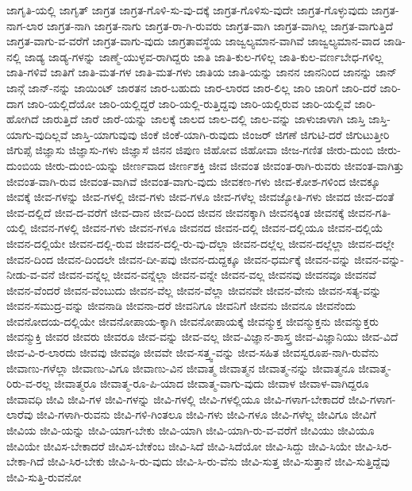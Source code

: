 {ಜಾಗೃತಿ-ಯಲ್ಲಿ
ಜಾಗೃತ್
ಜಾಗ್ರತ
ಜಾಗ್ರತ-ಗೊಳಿ-ಸು-ವು-ದಕ್ಕೆ
ಜಾಗ್ರತ-ಗೊಳಿಸು-ವುದೇ
ಜಾಗ್ರತ-ಗೊಳ್ಳುವುದು
ಜಾಗ್ರತ-ನಾಗ-ಲಾರ
ಜಾಗ್ರತ-ನಾಗಿ
ಜಾಗ್ರತ-ನಾಗು
ಜಾಗ್ರತ-ರಾ-ಗಿ-ರುವರು
ಜಾಗ್ರತ-ವಾಗಿ
ಜಾಗ್ರತ-ವಾಗಿಲ್ಲ
ಜಾಗ್ರತ-ವಾಗುತ್ತಿದೆ
ಜಾಗ್ರತ-ವಾಗು-ವ-ವರೆಗೆ
ಜಾಗ್ರತ-ವಾಗು-ವುದು
ಜಾಗ್ರತಾವಸ್ಥೆಯ
ಜಾಜ್ವಲ್ಯಮಾನ-ವಾಗಿವೆ
ಜಾಜ್ವಲ್ಯಮಾನ-ವಾದ
ಜಾಡಿ-ನಲ್ಲಿ
ಜಾಡ್ಯ
ಜಾಡ್ಯ-ಗಳನ್ನು
ಜಾಣ್ಮೆ-ಯುಳ್ಳವ-ರಾಗಿದ್ದರು
ಜಾತಿ
ಜಾತಿ-ಕುಲ-ಗಳಿಲ್ಲ
ಜಾತಿ-ಕುಲ-ವರ್ಣಬೇಧ-ಗಳಿಲ್ಲ
ಜಾತಿ-ಗಳಿವೆ
ಜಾತಿಗೆ
ಜಾತಿ-ಮತ-ಗಳ
ಜಾತಿ-ಮತ-ಗಳು
ಜಾತಿಯ
ಜಾತಿ-ಯನ್ನು
ಜಾನನ
ಜಾನನಿಂದ
ಜಾನನ್ನು
ಜಾನ್
ಜಾನ್ಗೆ
ಜಾನ್-ನನ್ನು
ಜಾಯಿಂಟ್
ಜಾರತನ
ಜಾರ-ಬಹುದು
ಜಾರ-ಲಾರದ
ಜಾರ-ಲಿಲ್ಲ
ಜಾರಿ
ಜಾರಿಗೆ
ಜಾರಿ-ದರೆ
ಜಾರಿ-ದಾಗ
ಜಾರಿ-ಯಲ್ಲಿದೆಯೋ
ಜಾರಿ-ಯಲ್ಲಿದ್ದರೆ
ಜಾರಿ-ಯಲ್ಲಿ-ರುತ್ತಿದ್ದವು
ಜಾರಿ-ಯಲ್ಲಿರುವ
ಜಾರಿ-ಯಲ್ಲಿವೆ
ಜಾರಿ-ಹೋಗಿದೆ
ಜಾರುತ್ತಿದೆ
ಜಾರೆ
ಜಾರೆ-ಯನ್ನು
ಜಾಲಕ್ಕೆ
ಜಾಲದ
ಜಾಲ-ದಲ್ಲಿ
ಜಾಲ-ವನ್ನು
ಜಾಳುಜಾಳಾಗಿ
ಜಾಸ್ತಿ
ಜಾಸ್ತಿ-ಯಾಗು-ವುದಿಲ್ಲವೆ
ಜಾಸ್ತಿ-ಯಾಗುವುವು
ಜಿಂಕೆ
ಜಿಂಕೆ-ಯಾಗಿ-ರುವುದು
ಜಿಂಜರ್
ಜಿಗಣೆ
ಜಿಗುಟಿ-ದರೆ
ಜಿಗುಟುತ್ತೀರಿ
ಜಿಗುಪ್ಸೆ
ಜಿಜ್ಞಾಸು
ಜಿಜ್ಞಾಸು-ಗಳು
ಜಿಜ್ಞಾಸೆ
ಜಿನನ
ಜಿಪುಣ
ಜಿಹೋವ
ಜಿಹೋವಾ
ಜೀಜ-ಗಣಿತ
ಜೀರು-ದುಂಬಿ
ಜೀರು-ದುಂಬಿಯ
ಜೀರು-ದುಂಬಿ-ಯನ್ನು
ಜೀರ್ಣವಾದ
ಜೀರ್ಣಶಕ್ತಿ
ಜೀವ
ಜೀವಂತ
ಜೀವಂತ-ರಾಗಿ-ರುವರು
ಜೀವಂತ-ವಾಗಿತ್ತು
ಜೀವಂತ-ವಾಗಿ-ರುವ
ಜೀವಂತ-ವಾಗಿವೆ
ಜೀವಂತ-ವಾಗು-ವುದು
ಜೀವಕಣ-ಗಳು
ಜೀವ-ಕೋಶ-ಗಳಿಂದ
ಜೀವಕ್ಕೂ
ಜೀವಕ್ಕೆ
ಜೀವ-ಗಳನ್ನು
ಜೀವ-ಗಳಲ್ಲಿ
ಜೀವ-ಗಳು
ಜೀವ-ಗಳೂ
ಜೀವ-ಗಳೆಲ್ಲ
ಜೀವಜ್ಯೋತಿ-ಗಳು
ಜೀವದ
ಜೀವ-ದಂತೆ
ಜೀವ-ದಲ್ಲಿದೆ
ಜೀವ-ದ-ವರೆಗೆ
ಜೀವ-ದಾನ
ಜೀವ-ದಿಂದ
ಜೀವನ
ಜೀವನಕ್ಕಾಗಿ
ಜೀವನಕ್ಕಿಂತ
ಜೀವನಕ್ಕೆ
ಜೀವನ-ಗತಿ-ಯಲ್ಲಿ
ಜೀವನ-ಗಳಲ್ಲಿ
ಜೀವನ-ಗಳು
ಜೀವನ-ಗಳೂ
ಜೀವನದ
ಜೀವನ-ದಲ್ಲಿ
ಜೀವನ-ದಲ್ಲಿಯೂ
ಜೀವನ-ದಲ್ಲಿಯೆ
ಜೀವನ-ದಲ್ಲಿಯೇ
ಜೀವನ-ದಲ್ಲಿ-ರುವ
ಜೀವನ-ದಲ್ಲಿ-ರು-ವು-ದೆಲ್ಲಾ
ಜೀವನ-ದಲ್ಲೆಲ್ಲ
ಜೀವನ-ದಲ್ಲೆಲ್ಲಾ
ಜೀವನ-ದಲ್ಲೇ
ಜೀವನ-ದಿಂದ
ಜೀವನ-ದಿಂದಲೇ
ಜೀವನ-ದೀ-ಪವು
ಜೀವನ-ದುದ್ದಕ್ಕೂ
ಜೀವನ-ಧರ್ಮಕ್ಕೆ
ಜೀವನ-ವನ್ನು
ಜೀವನ-ವನ್ನು-ನೀಡು-ವ-ವನೆ
ಜೀವನ-ವನ್ನೆಲ್ಲ
ಜೀವನ-ವನ್ನೆಲ್ಲಾ
ಜೀವನ-ವನ್ನೇ
ಜೀವನ-ವಲ್ಲ
ಜೀವನವು
ಜೀವನವೂ
ಜೀವನವೆ
ಜೀವನ-ವೆಂದರೆ
ಜೀವನ-ವೆಂಬುದು
ಜೀವನ-ವೆಲ್ಲ
ಜೀವನ-ವೆಲ್ಲಾ
ಜೀವನವೇ
ಜೀವನ-ವೇನು
ಜೀವನ-ಸತ್ಯ-ವನ್ನು
ಜೀವನ-ಸಮುದ್ರ-ವನ್ನು
ಜೀವನಾಡಿ
ಜೀವನಾ-ದರೆ
ಜೀವನಿಗೂ
ಜೀವನಿಗೆ
ಜೀವನು
ಜೀವನೂ
ಜೀವನೆಂದು
ಜೀವನೋದಯ-ದಲ್ಲಿಯೇ
ಜೀವನೋಪಾಯ-ಕ್ಕಾಗಿ
ಜೀವನೋಪಾಯಕ್ಕೆ
ಜೀವನ್ಮುಕ್ತ
ಜೀವನ್ಮುಕ್ತನು
ಜೀವನ್ಮುಕ್ತರು
ಜೀವನ್ಮುಕ್ತಿ
ಜೀವರ
ಜೀವರು
ಜೀವರೂ
ಜೀವ-ವನ್ನು
ಜೀವ-ವಲ್ಲ
ಜೀವ-ವಿಜ್ಞಾನ-ಶಾಸ್ತ್ರ
ಜೀವ-ವಿಜ್ಞಾನಿಯು
ಜೀವ-ವಿದೆ
ಜೀವ-ವಿ-ರ-ಲಾರದು
ಜೀವವು
ಜೀವವೂ
ಜೀವವೇ
ಜೀವ-ಸತ್ತ್ವ-ವನ್ನು
ಜೀವ-ಸಹಿತ
ಜೀವಸ್ವರೂಪ-ನಾಗಿ-ರುವೆನು
ಜೀವಾಣು-ಗಳೆಲ್ಲಾ
ಜೀವಾಣು-ವಿಗೂ
ಜೀವಾಣು-ವಿನ
ಜೀವಾತ್ಮ
ಜೀವಾತ್ಮನ
ಜೀವಾತ್ಮ-ನನ್ನು
ಜೀವಾತ್ಮನೂ
ಜೀವಾತ್ಮ-ರಿರು-ವ-ರಲ್ಲ
ಜೀವಾತ್ಮರೂ
ಜೀವಾತ್ಮ-ರೂ-ಪಿ-ಯಾದ
ಜೀವಾತ್ಮ-ವಾಗು-ವುದು
ಜೀವಾಳ
ಜೀವಾಳ-ವಾಗಿದ್ದರೂ
ಜೀವಾವಧಿ
ಜೀವಿ
ಜೀವಿ-ಗಳ
ಜೀವಿ-ಗಳನ್ನು
ಜೀವಿ-ಗಳಲ್ಲಿ
ಜೀವಿ-ಗಳಲ್ಲಿಯೂ
ಜೀವಿ-ಗಳಾಗ-ಬೇಕಾದರೆ
ಜೀವಿ-ಗಳಾಗ-ಲಾರೆವು
ಜೀವಿ-ಗಳಾಗಿ-ರುವನು
ಜೀವಿ-ಗಳಿ-ಗಿಂತಲೂ
ಜೀವಿ-ಗಳು
ಜೀವಿ-ಗಳೂ
ಜೀವಿ-ಗಳೆಲ್ಲ
ಜೀವಿಗೂ
ಜೀವಿಗೆ
ಜೀವಿಯ
ಜೀವಿ-ಯನ್ನು
ಜೀವಿ-ಯಾಗ-ಬೇಕು
ಜೀವಿ-ಯಾಗಿ
ಜೀವಿ-ಯಾಗಿ-ರು-ವ-ವರೆಗೆ
ಜೀವಿಯು
ಜೀವಿಯೂ
ಜೀವಿಯೇ
ಜೀವಿಸ-ಬೇಕಾದರೆ
ಜೀವಿಸ-ಬೇಕೆಂಬ
ಜೀವಿ-ಸಿದೆ
ಜೀವಿ-ಸಿದೆಯೋ
ಜೀವಿ-ಸಿದ್ದು
ಜೀವಿ-ಸಿಯೇ
ಜೀವಿ-ಸಿರ-ಬೇಕಾ-ಗಿದೆ
ಜೀವಿ-ಸಿರ-ಬೇಕು
ಜೀವಿ-ಸಿ-ರು-ವುದು
ಜೀವಿ-ಸಿ-ರು-ವೆನು
ಜೀವಿ-ಸುತ್ತ
ಜೀವಿ-ಸುತ್ತಾನೆ
ಜೀವಿ-ಸುತ್ತಿದ್ದೆವು
ಜೀವಿ-ಸುತ್ತಿ-ರುವನೋ
}
